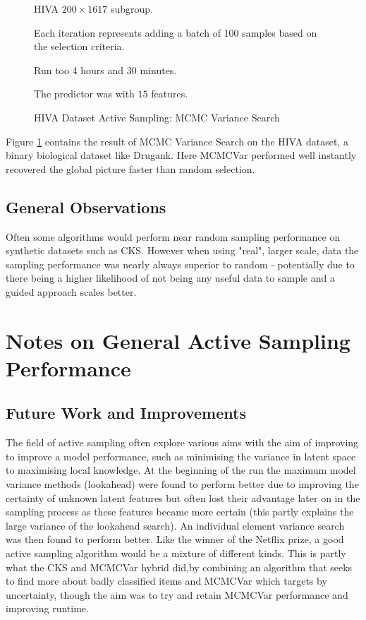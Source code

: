 \begin{figure}[!htbp]
  \begin{center}
    \resizebox{\textwidth}{!}{}
  \end{center}
  HIVA $200 \times 1617$ subgroup.
  
   Each iteration represents adding a batch of 100 samples based on the selection criteria.
   
   Run too 4 hours and 30 minutes.
  
   The predictor was with $15$ features.
      
    \caption{HIVA Dataset Active Sampling: MCMC Variance Search}
    \label{fig:hiva_mcmcmvar}
\end{figure}
Figure \ref{fig:hiva_mcmcmvar} contains the result of MCMC Variance Search on the HIVA dataset, a binary biological dataset like Drugank. Here MCMCVar performed well instantly recovered the global picture faster than random selection.

\subsection{General Observations}

Often some algorithms would perform near random sampling performance on synthetic datasets such as CKS. However when using "real", larger scale, data the sampling performance was nearly always superior to random - potentially due to there being a higher likelihood of not being any useful data to sample and a guided approach scales better.

\section{Notes on General Active Sampling Performance}
\subsection{Future Work and Improvements}
The field of active sampling often explore various aims with the aim of improving to improve a model performance, such as minimising the variance in latent space to maximising local knowledge. At the beginning of the run the maximum model variance methods (lookahead) were found to perform better due to improving the certainty of unknown latent features but often lost their advantage later on in the sampling process as these features became more certain (this partly explains the large variance of the lookahead search). An individual element variance search was then found to perform better. Like the winner of the Netflix prize, a good active sampling algorithm would be a mixture of different kinds. This is partly what the CKS and MCMCVar hybrid did,by combining an algorithm that seeks to find more about badly classified items and MCMCVar which targets by uncertainty, though the aim was to try and retain MCMCVar performance and improving runtime. 

